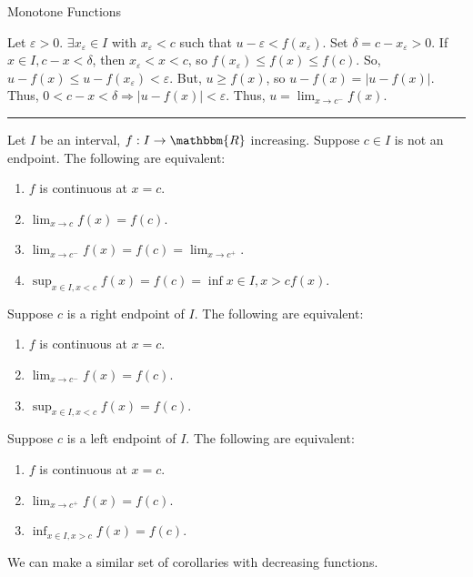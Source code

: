 \documentclass[10pt]{extarticle}
\newcommand{\R}{\mathbbm{R}}
\begin{document}
\begin{problem}{Monotone Functions}
\begin{description}
        Let $\varepsilon > 0$. $\exists x_{\varepsilon}\in I$ with $x_{\varepsilon} < c$ such that $ u - \varepsilon < f(x_{\varepsilon}) $. Set $\delta = c-x_{\varepsilon} > 0$. If $x\in I,c-x < \delta$, then $x_{\varepsilon} < x < c$, so $f(x_{\varepsilon}) \leq f(x) \leq f(c)$. So, $u - f(x) \leq u-f(x_{\varepsilon}) < \varepsilon$. But, $u \geq f(x)$, so $u-f(x) = |u-f(x)|$. Thus, $0 < c-x < \delta \Rightarrow |u-f(x)| < \varepsilon$. Thus, $u = \lim_{x\rightarrow c^-}f(x)$.
    \end{description}
    \vspace{4pt}
    \rule{\textwidth}{0.4pt}
    \vspace{4pt}
    Let $I$ be an interval, $f: I\rightarrow \R$ increasing. Suppose $c\in I$ is not an endpoint. The following are equivalent:
    \begin{enumerate}[(1)]
      \item $f$ is continuous at $x=c$.
      \item $\lim_{x\rightarrow c}f(x) = f(c)$.
      \item $\lim_{x\rightarrow c^-}f(x) = f(c) = \lim_{x\rightarrow c^{+}}$.
      \item $\sup_{x\in I,x < c} f(x) = f(c) = \inf{x\in I, x > c}f(x)$.
    \end{enumerate}
    Suppose $c$ is a right endpoint of $I$. The following are equivalent:
    \begin{enumerate}[(1)]
      \item $f$ is continuous at $x=c$.
      \item $\lim_{x\rightarrow c^{-}}f(x) = f(c)$.
      \item $\sup_{x\in I, x < c}f(x) = f(c)$.
    \end{enumerate}
    Suppose $c$ is a left endpoint of $I$. The following are equivalent:
    \begin{enumerate}[(1)]
      \item $f$ is continuous at $x=c$.
      \item $\lim_{x\rightarrow c^{+}}f(x) = f(c)$.
      \item $\inf_{x\in I, x > c}f(x) = f(c)$.
    \end{enumerate}
    We can make a similar set of corollaries with decreasing functions.
  \end{problem}
\end{document}

